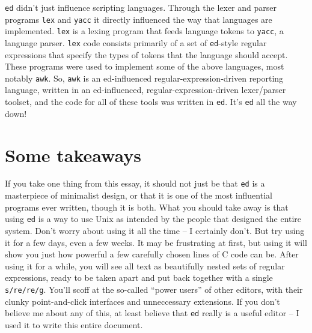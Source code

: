 \documentclass[12pt]{article}
\begin{document}
\lstinline{ed} didn't just influence scripting languages. Through the lexer and parser
programs \lstinline{lex} and \lstinline{yacc} it directly influenced the way that
languages are implemented. \lstinline{lex} is a lexing program that feeds
language tokens to \lstinline{yacc}, a language parser. \lstinline{lex} code consists
primarily of a set of \lstinline{ed}-style regular expressions that specify
the types of tokens that the language should accept. These programs were used to implement
some of the above languages, most notably \lstinline{awk}. So, \lstinline{awk} is an ed-influenced
regular-expression-driven reporting language, written in an ed-influenced, regular-expression-driven lexer/parser toolset,
and the code for all of these tools was written in \lstinline{ed}. It's \lstinline{ed} all the way down!

\section{Some takeaways}

If you take one thing from this essay, it should not just be that \lstinline{ed} is
a masterpiece of minimalist design, or that it is one of the most influential programs
ever written, though it is both. What you should take away is that using \lstinline{ed}
is a way to use Unix as intended by the people that designed
the entire system. Don't worry about using it all the time -- I certainly don't. But try
using it for a few days, even a few weeks. It may be frustrating at first, but using
it will show you just how powerful a few carefully chosen lines of C code can be.
After using it for a while, you will see all text as beautifully nested sets of
regular expressions, ready to be taken apart and put back together with a single
\lstinline{s/re/re/g}. You'll scoff at the so-called ``power users'' of other editors,
with their clunky point-and-click interfaces and unneccessary extensions.
If you don't believe me about any of this, at least believe that \lstinline{ed} really
is a useful editor -- I used it to write this entire document.



\end{document}
